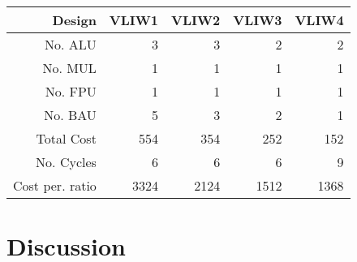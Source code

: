 \documentclass[titlepage, a4paper]{article}
\begin{document}
\begin{table}[H]
  \caption{}
  \label{tab:performance}
  \scriptsize
  \centering
  \begin{tabular}{|*{5}{r|}}
    \hline
        {\bfseries Design} & {\bfseries VLIW1} & {\bfseries VLIW2} & {\bfseries VLIW3} & {\bfseries VLIW4} \\ \hline
        {No. ALU} & {3} & {3} & {2} & {2} \\ \hline
        {No. MUL} & {1} & {1} & {1} & {1} \\ \hline
        {No. FPU} & {1} & {1} & {1} & {1} \\ \hline
        {No. BAU} & {5} & {3} & {2} & {1} \\ \hline
        {Total Cost} & {554} & {354} & {252} & {152} \\ \hline
        {No. Cycles} & {6} & {6} & {6} & {9} \\ \hline
        {Cost per. ratio} & {3324} & {2124} & {1512} & {1368} \\ \hline
  \end{tabular}
\end{table}


\section{Discussion}
\end{document}
